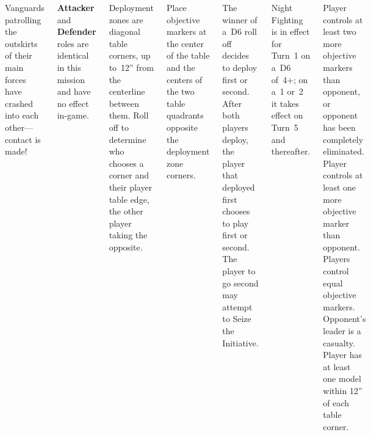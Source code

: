 
\begin{columns}

  Vanguards patrolling the outskirts of their main forces have crashed
  into each other---contact is made!

  \textbf{Attacker} and \textbf{Defender} roles are identical in this
  mission and have no effect in-game.

%


Deployment zones are diagonal table corners, up to~12'' from the
centerline between them.  Roll off to determine who chooses a corner
and their player table edge, the other player taking the opposite.

Place objective markers at the center of the table and the centers of
the two table quadrants opposite the deployment zone corners.

%

The winner of a~D6 roll off decides to deploy first or second.  After
both players deploy, the player that deployed first chooses to play
first or second.  The player to go second may attempt to Seize the
Initiative.

Night Fighting is in effect for Turn~1 on a~D6 of~4+; on a~1 or~2 it
takes effect on Turn~5 and thereafter.

\columnbreak

\scoringbox
{Player controls at least
  two more objective markers than opponent, or opponent has been
  completely eliminated.}
{Player controls at least one more
                       objective marker than opponent.}
{Players control equal objective markers.}
{Opponent's leader is a casualty.}
{Player has at least one model within 12'' of each table corner.}

\end{columns}
